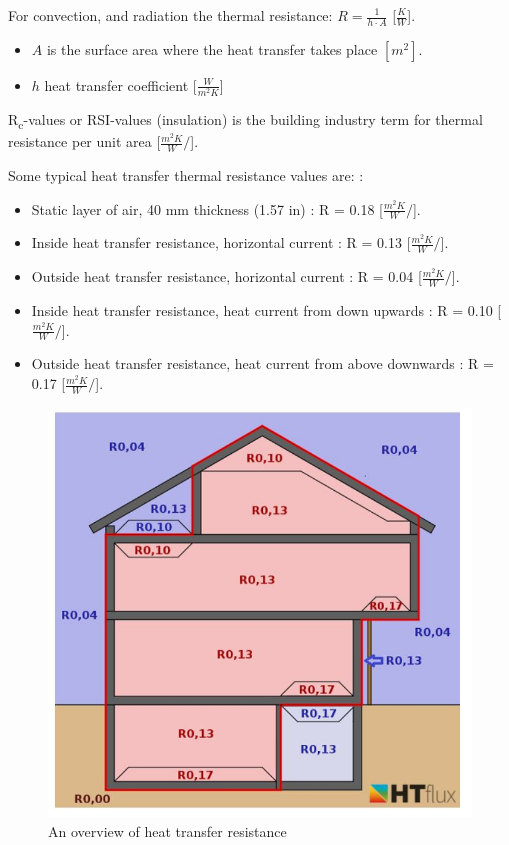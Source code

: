 For convection, and radiation the thermal resistance: $R = \frac{1}{h \cdot A}$ [$\frac{K}{W}$].

\begin{itemize}
    \item $A$ is the surface area where the heat transfer takes place $[m^2]$.
    \item $h$  heat transfer coefficient  [$\frac{W}{m^2K}$]
\end{itemize}

R\textsubscript{c}-values or RSI-values (insulation) is the building industry term for thermal resistance per unit area \cite{Rvalues_insulation} [$\frac{m^2K}{W}/$].

Some typical heat transfer thermal resistance values are: \cite{OVERALL}: 

\begin{itemize}
	\item Static layer of air, 40 mm thickness (1.57 in)  : R = 0.18 [$\frac{m^2K}{W}/$].
	\item Inside heat transfer resistance, horizontal current : R = 0.13 [$\frac{m^2K}{W}/$]. 
	\item Outside heat transfer resistance, horizontal current : R = 0.04 [$\frac{m^2K}{W}/$].
	\item Inside heat transfer resistance, heat current from down upwards : R = 0.10 [$\frac{m^2K}{W}/$].
	\item Outside heat transfer resistance, heat current from above downwards : R = 0.17 [$\frac{m^2K}{W}/$].
	
\end{itemize}

\begin{figure}[H]
	\centering
	\includegraphics[width=0.8\columnwidth]{Pictures/Overview of heat resistances.JPG}
	\caption[Short title]{An overview of heat transfer resistance\cite{SURFREST}}
	\label{fig:overview}
\end{figure}


